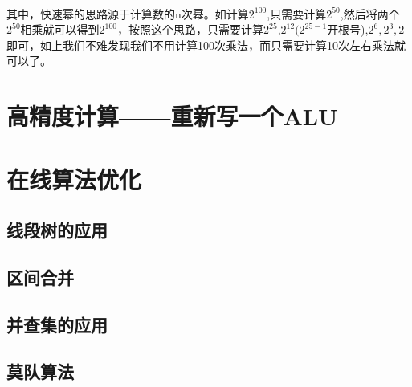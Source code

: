\documentclass[12pt,a4paper,UTF16]{ctexbook}
\theoremstyle{plain}
\begin{document}
\paragraph{}其中，快速幂的思路源于计算数的n次幂。如计算$2^{100}$,只需要计算$2^{50}$,然后将两个$2^{50}$相乘就可以得到$2^{100}$，按照这个思路，只需要计算$2^{25}$,$2^{12}$$(2^{25-1}$开根号),$2^{6},2^3,2$即可，如上我们不难发现我们不用计算100次乘法，而只需要计算10次左右乘法就可以了。
\section{高精度计算——重新写一个ALU}
\section{在线算法优化}
\subsection{线段树的应用}
\subsection{区间合并}
\subsection{并查集的应用}
\subsection{莫队算法}
\end{document}
